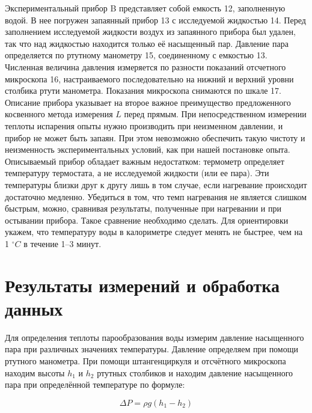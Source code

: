 \documentclass[a4paper, 12pt]{article}
\begin{document}
    \noindent Экспериментальный прибор B представляет собой емкость 12, заполненную водой. В нее погружен запаянный прибор 13 с исследуемой жидкостью 14. Перед заполнением исследуемой жидкости воздух из запаянного прибора был удален, так что над жидкостью находится только её насыщенный пар. Давление пара определяется по ртутному манометру 15, соединенному с емкостью 13. Численная величина давления измеряется по разности показаний отсчетного микроскопа 16, настраиваемого последовательно на нижний и верхний уровни столбика ртути манометра. Показания микроскопа снимаются по шкале 17. \\

    \noindent Описание прибора указывает на второе важное преимущество предложенного косвенного метода измерения $L$ перед прямым. При непосредственном измерении теплоты испарения опыты нужно производить при неизменном давлении, и прибор не может быть запаян. При этом невозможно обеспечить такую чистоту и неизменность экспериментальных условий, как при нашей постановке опыта. \\

    \noindent Описываемый прибор обладает важным недостатком: термометр определяет температуру термостата, а не исследуемой жидкости (или ее пара). Эти температуры близки друг к другу лишь в том случае, если нагревание происходит достаточно медленно. Убедиться в том, что темп нагревания не является слишком быстрым, можно, сравнивая результаты, полученные при нагревании и при остывании прибора. Такое сравнение необходимо сделать. Для ориентировки укажем, что температуру воды в калориметре следует менять не быстрее, чем на 1 $^\circ C$ в течение 1–3 минут.

    \section*{Результаты измерений и обработка данных}

    \noindent Для определения теплоты парообразования воды измерим давление насыщенного пара при различных значениях температуры. Давление определяем при помощи ртутного манометра. При помощи штангенциркуля и отсчётного микроскопа находим высоты $h_1$ и $h_2$ ртутных столбиков и находим давление насыщенного пара при определённой температуре по формуле:
    
    \begin{equation}
        \label{P}
        \Delta P = \rho g (h_1 - h_2)
    \end{equation}
\end{document}
